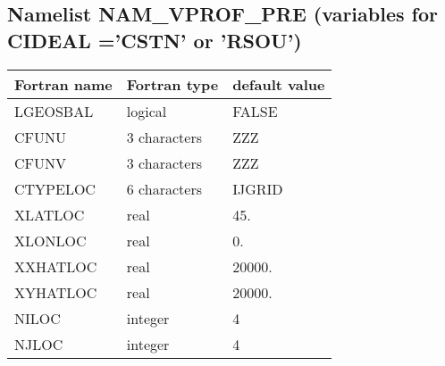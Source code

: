            
\subsection{Namelist NAM\_VPROF\_PRE (variables for CIDEAL ='CSTN' or 'RSOU')}

\begin{center}
\begin{tabular} {|l|l|l|}
\hline
Fortran name & Fortran type & default value \\
\hline
LGEOSBAL    &  logical   & FALSE   \\
CFUNU       & 3 characters  & ZZZ  \\
CFUNV       & 3 characters  & ZZZ  \\
CTYPELOC     &  6 characters & IJGRID \\
XLATLOC  &  real   & 45.  \\
XLONLOC  &  real   &  0.  \\
XXHATLOC  &  real   &  20000.  \\
XYHATLOC  &  real   &  20000.  \\
NILOC     &  integer & 4    \\
NJLOC     &  integer & 4    \\
\hline
\end{tabular}
\end{center}



